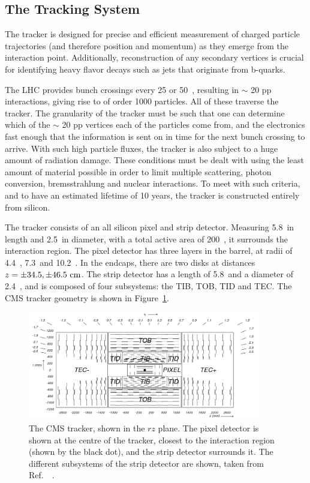 \subsection{The Tracking System}
The tracker is designed for precise and efficient measurement of charged particle trajectories (and therefore position and momentum) as they emerge from the interaction point.
Additionally, reconstruction of any secondary vertices is crucial for identifying heavy flavor decays such as jets that originate from b-quarks.

The \ac{LHC} provides bunch crossings every 25 or 50~\ns, resulting in $\sim$ 20 pp interactions, giving rise to of order 1000 particles. 
All of these traverse the tracker. 
The granularity of the tracker must be such that one can determine which of the $\sim$ 20 pp vertices each of the particles come from, 
and the electronics fast enough that the information is sent on in time for the next bunch crossing to arrive.
With such high particle fluxes, the tracker is also subject to a huge amount of radiation damage.
These conditions must be dealt with using the least amount of material possible in order to limit multiple scattering, photon conversion, bremsstrahlung and nuclear interactions.
To meet with such criteria, and to have an estimated lifetime of 10 years, the tracker is constructed entirely from silicon.

The tracker consists of an all silicon pixel and strip detector.
Measuring 5.8~\m in length and 2.5~\m in diameter, with a total active area of 200~\msq, it surrounds the interaction region.
The pixel detector has three layers in the barrel, at radii of 4.4~\cm, 7.3~\cm and 10.2~\cm. In the endcaps, there are two disks at distances $z=\pm 34.5, \pm 46.5~\mathrm{cm}$.
The strip detector has a length of 5.8~\m and a diameter of 2.4~\m, and is composed of four subsystems: the \ac{TIB}, \ac{TOB}, \ac{TID} and \ac{TEC}. The \ac{CMS} tracker geometry is shown in Figure~\ref{fig:CMStracker}.

\begin{figure}[htbp]
  \begin{center}
  \includegraphics[width=0.9\textwidth]{Figures/detector/fig_cmstracker}
  \caption{The \ac{CMS} tracker, shown in the $rz$ plane. The pixel detector is shown at the centre of the tracker, closest to the interaction region (shown by the black dot), and the strip detector surrounds it. The different subsystems of the strip detector are shown, taken from Ref.~~\cite{Chatrchyan:2008aa}.
}
  \label{fig:CMStracker}
  \end{center}
\end{figure}

